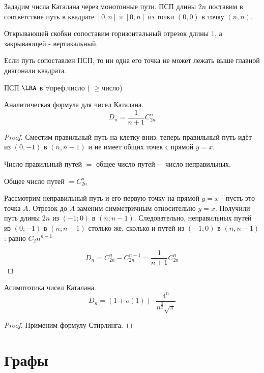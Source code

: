 \documentclass[a4paper, 14pt]{article}
\begin{document}
    Зададим числа Каталана через монотонные пути.
    ПСП длины $2n$ поставим в соответствие путь в квадрате $[0, n] \times [0, n]$
        из точки $(0, 0)$ в точку $(n, n)$.
        
        Открывающей скобки сопоставим горизонтальный отрезок длины $1$, а закрывающей -
        вертикальный.

        Если путь сопоставлен ПСП, то ни одна его точка не может лежать выше 
        главной диагонали квадрата.
    \begin{theorem}
        ПСП $\LRA$ в $\forall преф. число$ ( $\geq $число)
    \end{theorem}

    \begin{theorem}
        Аналитическая формула для чисел Каталана.
        \[D_n = \dfrac{1}{n+1}C^n_{2n}\]
    \end{theorem}
    \begin{proof}
        Сместим правильный путь на клетку вниз: теперь правильный
        путь идёт из $(0, -1)$ в $(n, n-1)$ и не имеет общих точек
        с прямой $y=x$.

        Число правильный путей $=$ общее число путей $-$ число неправильных.

        Общее число путей $= C^n_{2n}$

        Рассмотрим неправильный путь и его первую точку на 
        прямой $y=x$ - пусть это точка $A$. Отрезок до $A$ заменим
        симметричным относительно $y=x$. Получили путь длины $2n$
        из $(-1; 0)$ в $(n; n-1)$.
        Следовательно, неправильных путей из $(0; -1)$ в $(n;n-1)$ 
        столько же, сколько и путей из $(-1; 0)$ в $(n, n-1)$:
        равно $C_2n^{n-1}$ 

        \[D_n = C^n_{2n} - C^{n-1}_{2n} = \dfrac{1}{n+1}C_{2n}^n\]
    \end{proof}

    \begin{theorem}
        Асимптотика чисел Каталана.
        \[D_n = (1 + o(1)) \cdot \dfrac{4^n}{n^{\frac{3}{2}}\sqrt{\pi}}\]
    \end{theorem}
    \begin{proof}
        Применим формулу Стирлинга.
    \end{proof}

    \section{Графы}
\end{document}
